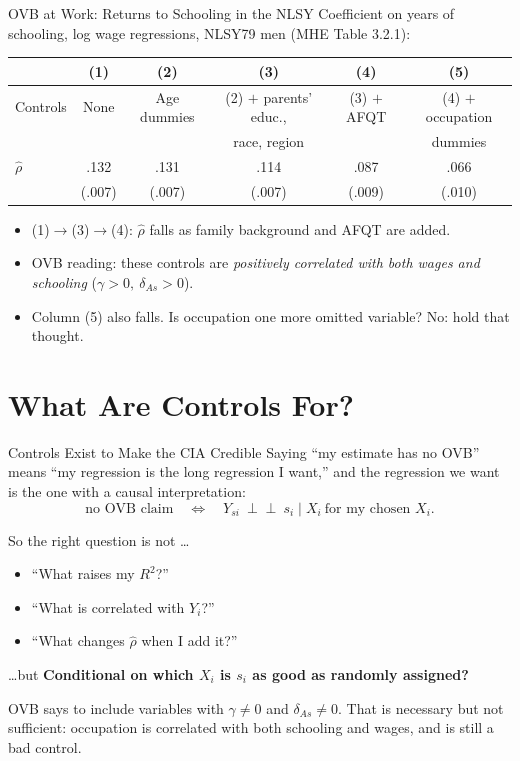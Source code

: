 \documentclass[aspectratio=169,11pt]{beamer}
\newcommand{\indep}{\perp\!\!\!\perp}
\begin{document}
\begin{frame}{OVB at Work: Returns to Schooling in the NLSY}
\small
Coefficient on years of schooling, log wage regressions, NLSY79 men (MHE Table 3.2.1):
\medskip
\begin{center}
\renewcommand{\arraystretch}{1.25}
\begin{tabular}{@{}lccccc@{}}
\toprule
& (1) & (2) & (3) & (4) & (5)\\
\midrule
Controls & None & Age dummies & (2) $+$ parents' educ., & (3) $+$ AFQT & (4) $+$ occupation\\
& & & race, region & & dummies\\
\midrule
$\hat\rho$ & .132 & .131 & .114 & .087 & .066\\
& (.007) & (.007) & (.007) & (.009) & (.010)\\
\bottomrule
\end{tabular}
\end{center}
\medskip
\begin{itemize}
\setlength{\itemsep}{0.35em}
\item (1)$\to$(3)$\to$(4): $\hat\rho$ falls as family background and AFQT are added.
\item OVB reading: these controls are \emph{positively correlated with both wages and schooling} ($\gamma>0,\ \delta_{As}>0$).
\item Column (5) also falls. Is occupation one more omitted variable? \alert{No: hold that thought.}
\end{itemize}
\end{frame}

\section{What Are Controls For?}
\begin{frame}{Controls Exist to Make the CIA Credible}
\small
Saying ``my estimate has no OVB'' means ``my regression is the long regression I want,''
and the regression we want is the one with a causal interpretation:
\[
\text{no OVB claim}\quad\Longleftrightarrow\quad Y_{si}\ \indep\ s_i\mid X_i\ \text{for my chosen }X_i .
\]
\begin{block}{So the right question is not \dots}
\begin{itemize}
\item ``What raises my $R^2$?''
\item ``What is correlated with $Y_i$?''
\item ``What changes $\hat\rho$ when I add it?''
\end{itemize}
\end{block}
\begin{block}{\dots but}
\centering
\textbf{Conditional on which $X_i$ is $s_i$ as good as randomly assigned?}
\end{block}
\medskip
OVB says to include variables with $\gamma\neq0$ and $\delta_{As}\neq0$. That is necessary but \alert{not sufficient}:
occupation is correlated with both schooling and wages, and is still a bad control.
\end{frame}
\end{document}
